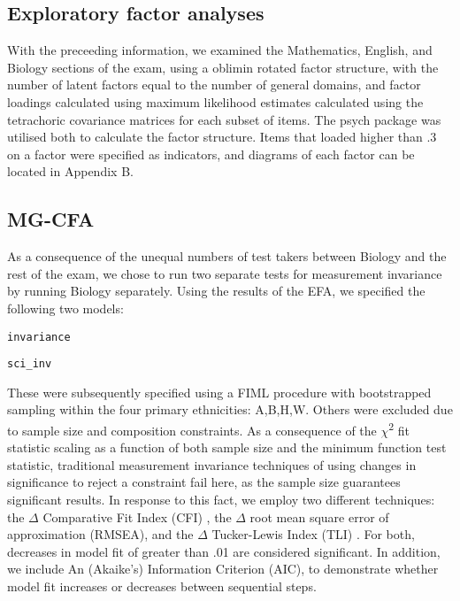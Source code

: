 \documentclass{article}\usepackage[]{graphicx}\usepackage[]{color}
\makeatletter
\newcommand{\hlstd}[1]{\textcolor[rgb]{0.345,0.345,0.345}{#1}}%
\newenvironment{kframe}{%
 \def\at@end@of@kframe{}%
 \ifinner\ifhmode%
  \def\at@end@of@kframe{\end{minipage}}%
  \begin{minipage}{\columnwidth}%
 \fi\fi%
 \def\FrameCommand##1{\hskip\@totalleftmargin \hskip-\fboxsep
 \colorbox{shadecolor}{##1}\hskip-\fboxsep
     \hskip-\linewidth \hskip-\@totalleftmargin \hskip\columnwidth}%
 \MakeFramed {\advance\hsize-\width
   \@totalleftmargin\z@ \linewidth\hsize
   \@setminipage}}%
 {\par\unskip\endMakeFramed%
 \at@end@of@kframe}
\newenvironment{knitrout}{}{} %
\makeatother
\begin{document}
\subsection{Exploratory factor analyses}
With the preceeding information, we examined the Mathematics, English, and Biology sections of the exam, using a oblimin rotated factor structure, with the number of latent factors equal to the number of general domains, and factor loadings calculated using maximum likelihood estimates calculated using the tetrachoric covariance matrices for each subset of items. The psych package was utilised both to calculate the factor structure. Items that loaded higher than .3 on a factor were specified as indicators, and diagrams of each factor can be located in Appendix B.
\subsection{MG-CFA}
As a consequence of the unequal numbers of test takers between Biology and the rest of the exam, we chose to run two separate tests for measurement invariance by running Biology separately. Using the results of the EFA, we specified the following two models:
\begin{knitrout}
\color{fgcolor}\begin{kframe}
\begin{alltt}
\hlstd{invariance}
\end{alltt}


{\ttfamily\noindent\bfseries\color{errorcolor}{\#\# Error: object 'invariance' not found}}\begin{alltt}
\hlstd{sci_inv}
\end{alltt}


{\ttfamily\noindent\bfseries\color{errorcolor}{\#\# Error: object 'sci\_inv' not found}}\end{kframe}
\end{knitrout}

These were subsequently specified using a FIML procedure with bootstrapped sampling within the four primary ethnicities: A,B,H,W. Others were excluded due to sample size and composition constraints. As a consequence of the $\chi$\textsuperscript{2} fit statistic scaling as a function of both sample size and the minimum function test statistic, traditional measurement invariance techniques of using changes in significance to reject a constraint fail here, as the sample size guarantees significant results. In response to this fact, we employ two different techniques: the $\Delta$ Comparative Fit Index (CFI) \cite{Bentler}, the $\Delta$ root mean square error of approximation (RMSEA), and the $\Delta$ Tucker-Lewis Index (TLI) \cite{Chen}. For both, decreases in model fit of greater than .01 are considered significant. In addition, we include An (Akaike's) Information Criterion (AIC), to demonstrate whether model fit increases or decreases between sequential steps.
\end{document}
